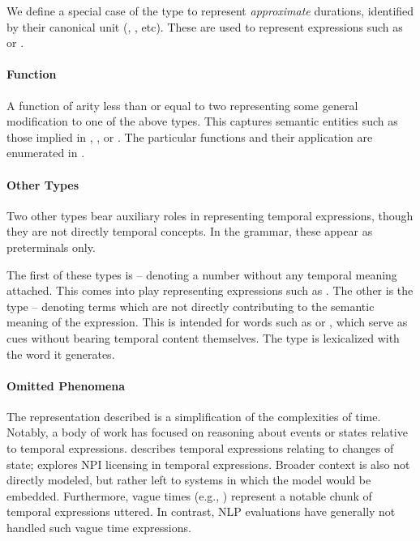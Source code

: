 We define a special case of the  type to represent 
	\textit{approximate} durations, identified by their canonical
	unit (, , etc).
These are used to represent expressions such as  or
	.

\paragraph{Function}
A function of arity less than or equal to two representing some
	general modification to one of the above types.
This captures semantic entities such as those implied in
	, 
	, or .
The particular functions and their application are enumerated in 
	.


\paragraph{Other Types}
Two other types bear auxiliary roles in representing temporal expressions,
	though they are not directly temporal concepts.
In the grammar, these appear as preterminals only.

The first of these types is  -- denoting a number without
	any temporal meaning attached.
This comes into play representing expressions such as .
The other is the  type -- denoting terms which are not
	directly contributing to the semantic meaning of the expression.
This is intended for words such as  or , which serve as cues
	without bearing temporal content themselves.
The  type is lexicalized with the word it generates.


\paragraph{Omitted Phenomena}
The representation described is a simplification of the complexities of
	time.
Notably, a body of work has focused on reasoning about events or states
	relative to temporal expressions.
 describes temporal expressions relating to
	changes of state; 
	 explores NPI licensing in temporal
	expressions.
Broader context is also not directly modeled, but rather left to systems
	in which the model would be embedded.
Furthermore, vague times (e.g., ) represent a notable chunk of 
	temporal expressions uttered.
In contrast, NLP evaluations have generally not handled such vague 
	time expressions.


